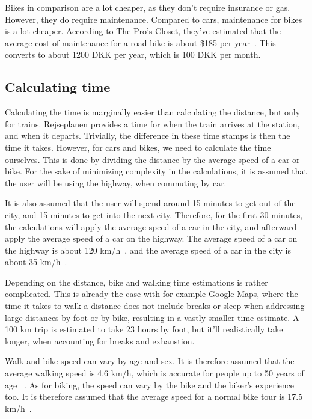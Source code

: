 Bikes in comparison are a lot cheaper, as they don't require insurance or gas.
However, they do require maintenance.
Compared to cars, maintenance for bikes is a lot cheaper.
According to The Pro's Closet, they've estimated that the average cost of maintenance for a road bike is about \$185 per
year~\cite{price_bike}.
This converts to about 1200 DKK per year, which is 100 DKK per month.

\subsection{Calculating time}\label{subsec:calculating-time}

Calculating the time is marginally easier than calculating the distance, but only for trains.
Rejseplanen provides a time for when the train arrives at the station, and when it departs.
Trivially, the difference in these time stamps is then the time it takes.
However, for cars and bikes, we need to calculate the time ourselves.
This is done by dividing the distance by the average speed of a car or bike.
For the sake of minimizing complexity in the calculations, it is assumed that the user will be using the highway, when
commuting by car.

It is also assumed that the user will spend around 15 minutes to get out of the city, and 15 minutes to get into the
next city.
Therefore, for the first 30 minutes, the calculations will apply the average speed of a car in the city, and
afterward apply the average speed of a car on the highway.
The average speed of a car on the highway is about 120 km/h~\cite{time_highway}, and the average speed of a car in
the city is about 35 km/h~\cite{time_city}.

Depending on the distance, bike and walking time estimations is rather complicated.
This is already the case with for example Google Maps, where the time it takes to walk a distance does not include
breaks or sleep when addressing large distances by foot or by bike, resulting in a vastly smaller time estimate.
A 100 km trip is estimated to take 23 hours by foot, but it'll realistically take longer, when accounting for breaks
and exhaustion.

Walk and bike speed can vary by age and sex.
It is therefore assumed that the average walking speed is 4.6 km/h, which is accurate for people up to 50 years of age
~\cite{time_walk}.
As for biking, the speed can vary by the bike and the biker's experience too.
It is therefore assumed that the average speed for a normal bike tour is 17.5 km/h~\cite{time_bike}.

